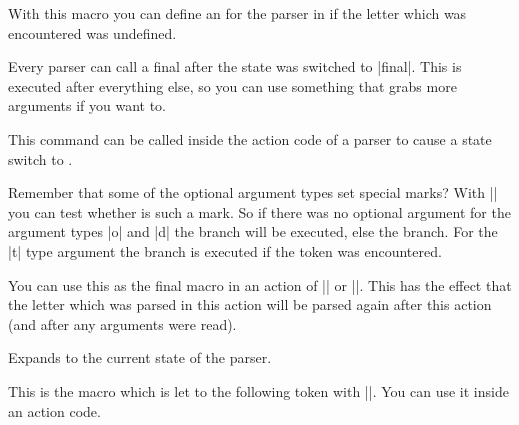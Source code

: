 \begin{command}{\pgfparserdefunknown{}}%
    With this macro you can define an  for the 
    parser in  if the letter which was encountered was undefined.
\end{command}%

\begin{command}{\pgfparserdeffinal{}}%
   Every parser can call a final  after the state was switched to
    |final|. This  is executed after everything else, so you can
    use something that grabs more arguments if you want to.
\end{command}%

\begin{command}{\pgfparserswitch{}}%
    This command can be called inside the action code of a parser to cause a
    state switch to .
\end{command}%

\begin{command}{\pgfparserifmark{}}%
    Remember that some of the optional argument types set special marks? With
    |\pgfparserifmark| you can test whether  is such a mark. So if
    there was no optional argument for the argument types |o| and |d| the
     branch will be executed, else the  branch. For the
    |t| type argument the  branch is executed if the token was
    encountered.
\end{command}%

\begin{command}{\pgfparserreinsert}%
    You can use this as the final macro in an action of |\pgfparserdef| or
    |\pgfparserdefunknown|. This has the effect that the letter which was
    parsed in this action will be parsed again after this action (and after any
    arguments were read).
\end{command}%

\begin{command}{\pgfparserstate}%
    Expands to the current state of the parser.
\end{command}%

\begin{command}{\pgfparsertoken}%
    This is the macro which is let to the following token with |\futurelet|.
    You can use it inside an action code.
\end{command}%

